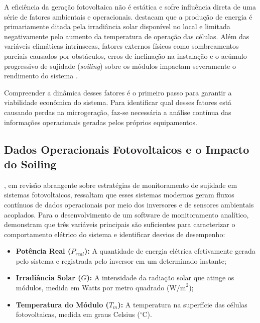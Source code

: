 \documentclass{UNESC}
\begin{document}
A eficiência da geração fotovoltaica não é estática e sofre influência
direta de uma série de fatores ambientais e operacionais.
 destacam que a produção de energia é
primariamente ditada pela irradiância solar disponível no local e
limitada negativamente pelo aumento da temperatura de operação das
células. Além das variáveis climáticas intrínsecas, fatores externos
físicos como sombreamentos parciais causados por obstáculos, erros de
inclinação na instalação e o acúmulo progressivo de sujidade
(\textit{soiling}) sobre os módulos impactam severamente o rendimento do
sistema \cite{pinho2014manual}.

Compreender a dinâmica desses fatores é o primeiro passo para garantir a
viabilidade econômica do sistema. Para identificar qual desses fatores
está causando perdas na microgeração, faz-se necessária a análise
contínua das informações operacionais geradas pelos próprios equipamentos.

\subsection{Dados Operacionais Fotovoltaicos e o Impacto do Soiling}


, em revisão abrangente sobre estratégias de
monitoramento de sujidade em sistemas fotovoltaicos, ressaltam que esses
sistemas modernos geram fluxos contínuos de dados operacionais por meio
dos inversores e de sensores ambientais acoplados. Para o desenvolvimento
de um software de monitoramento analítico,  demonstram que três variáveis principais são suficientes para
caracterizar o comportamento elétrico do sistema e identificar desvios
de desempenho:

\begin{itemize}
    \item \textbf{Potência Real ($P_{real}$):} A quantidade de energia
    elétrica efetivamente gerada pelo sistema e registrada pelo inversor em
    um determinado instante;

    \item \textbf{Irradiância Solar ($G$):} A intensidade da radiação solar
    que atinge os módulos, medida em Watts por metro quadrado
    ($\text{W/m}^2$);

    \item \textbf{Temperatura do Módulo ($T_m$):} A temperatura na superfície
    das células fotovoltaicas, medida em graus Celsius ($^\circ\text{C}$).
\end{itemize}
\end{document}
